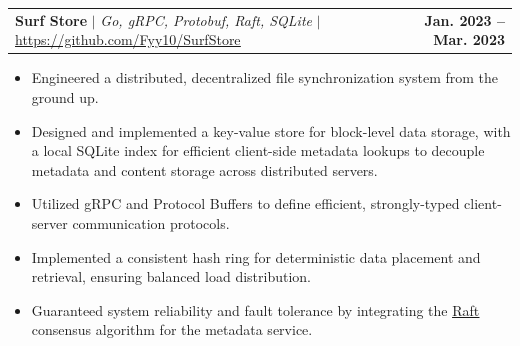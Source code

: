 \documentclass[letterpaper,11pt]{article}
\makeatletter
\newcommand{\resumeItem}[1]{
  \item\small{
    {#1 \vspace{-2pt}}
  }
}
\newcommand{\resumeProjectHeading}[2]{
    \item
    \begin{tabular*}{1.0\textwidth}{l@{\extracolsep{\fill}}r}
      \small#1 & \textbf{\small #2}\\
    \end{tabular*}\vspace{-7pt}
}
\newcommand{\resumeItemListStart}{\begin{itemize}}
\newcommand{\resumeItemListEnd}{\end{itemize}\vspace{-5pt}}
\makeatother
\begin{document}
\vspace{-4pt}

\resumeProjectHeading
{\textbf{Surf Store} $|$ \emph{Go, gRPC, Protobuf, Raft, SQLite} $|$ \href{https://github.com/Fyy10/SurfStore}{\underline{https://github.com/Fyy10/SurfStore}}}{Jan. 2023 -- Mar. 2023}
\resumeItemListStart
    \resumeItem{Engineered a distributed, decentralized file synchronization system from the ground up.}
    \resumeItem{Designed and implemented a key-value store for block-level data storage, with a local SQLite index for efficient client-side metadata lookups to decouple metadata and content storage across distributed servers.}
    \resumeItem{Utilized gRPC and Protocol Buffers to define efficient, strongly-typed client-server communication protocols.}
    \resumeItem{Implemented a consistent hash ring for deterministic data placement and retrieval, ensuring balanced load distribution.}
    \resumeItem{Guaranteed system reliability and fault tolerance by integrating the \href{https://raft.github.io/}{\underline{Raft}} consensus algorithm for the metadata service.}
\resumeItemListEnd




\end{document}
